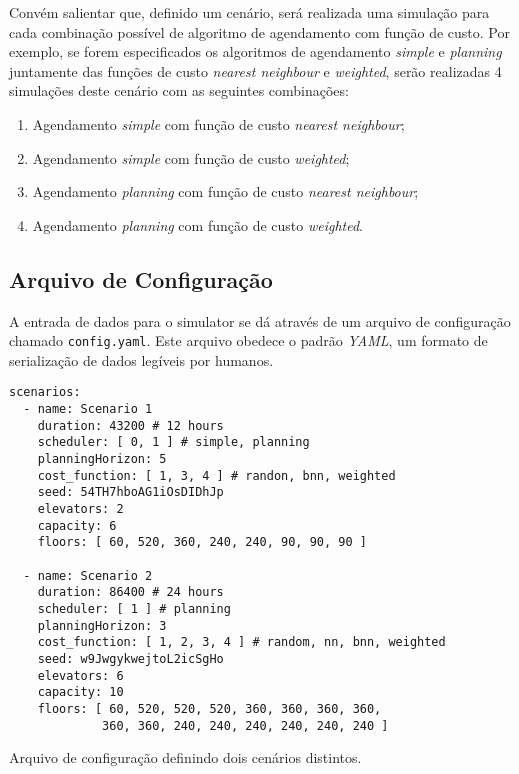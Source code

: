 Convém salientar que, definido um cenário, será realizada uma simulação para cada
combinação possível de algoritmo de agendamento com função de custo. Por
exemplo, se forem especificados os algoritmos de agendamento \textit{simple} e
\textit{planning} juntamente das funções de custo \textit{nearest neighbour} e
\textit{weighted}, serão realizadas 4 simulações deste cenário com as seguintes
combinações:

\begin{enumerate}
  \item Agendamento \textit{simple} com função de custo \textit{nearest neighbour};
  \item Agendamento \textit{simple} com função de custo \textit{weighted};
  \item Agendamento \textit{planning} com função de custo \textit{nearest neighbour};
  \item Agendamento \textit{planning} com função de custo \textit{weighted}.
\end{enumerate}

\subsection{\label{simulator:model:config}Arquivo de Configuração}

A entrada de dados para o simulator se dá através de um arquivo de configuração
chamado \texttt{config.yaml}. Este arquivo obedece o padrão \textit{YAML}, um
formato de serialização de dados legíveis por humanos.

\begin{algorithm}[htb]
  \centering
    \begin{verbatim}
scenarios:
  - name: Scenario 1
    duration: 43200 # 12 hours
    scheduler: [ 0, 1 ] # simple, planning
    planningHorizon: 5
    cost_function: [ 1, 3, 4 ] # randon, bnn, weighted
    seed: 54TH7hboAG1iOsDIDhJp
    elevators: 2
    capacity: 6
    floors: [ 60, 520, 360, 240, 240, 90, 90, 90 ]

  - name: Scenario 2
    duration: 86400 # 24 hours
    scheduler: [ 1 ] # planning
    planningHorizon: 3
    cost_function: [ 1, 2, 3, 4 ] # random, nn, bnn, weighted
    seed: w9JwgykwejtoL2icSgHo
    elevators: 6
    capacity: 10
    floors: [ 60, 520, 520, 520, 360, 360, 360, 360,
             360, 360, 240, 240, 240, 240, 240, 240 ]
    \end{verbatim}
  \caption{Arquivo de configuração definindo dois cenários distintos.}
  \label{alg:config}
\end{algorithm}

